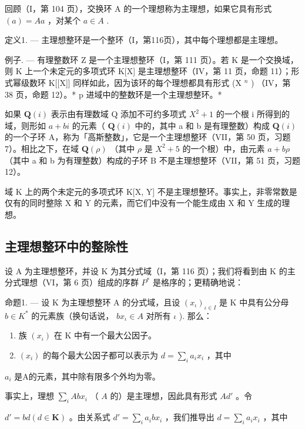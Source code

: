 回顾（I，第 104 页），交换环 A 的一个理想称为主理想，如果它具有形式 \((a) = A a\) ，对某个 \(a \in A\) .

定义1. --- 主理想整环是一个整环（I，第116页），其中每个理想都是主理想。

例子. --- 有理整数环 Z 是一个主理想整环（I，第 111 页）。若 K 是一个交换域，则 K 上一个未定元的多项式环 K{[}X{]} 是主理想整环（IV，第 11 页，命题 11）；形式幂级数环 K{[}{[}X{]}{]} 同样如此，因为该环的每个理想都具有形式 (X \(^{n}\) ) （IV，第 38 页，命题 12）。* p 进域中的整数环是一个主理想整环。*

如果 \(\mathbf{Q}(i)\) 表示由有理数域 Q 添加不可约多项式 \(X^{2}+1\) 的一个根 i 所得到的域，则形如 \(a+bi\) 的元素（ \(\mathbf{Q}(i)\) 中的，其中 a 和 b 是有理整数）构成 \(\mathbf{Q}(i)\) 的一个子环 A，称为「高斯整数」，它是一个主理想整环（VII，第 50 页，习题 7）。相比之下，在域 \(\mathbf{Q}(\rho)\) （其中 \(\rho\) 是 \(X^{2}+5\) 的一个根）中，由元素 \(a+b\rho\) （其中 a 和 b 为有理整数）构成的子环 B 不是主理想整环（VII，第 51 页，习题 12）。

域 K 上的两个未定元的多项式环 K{[}X, Y{]} 不是主理想整环。事实上，非零常数是仅有的同时整除 X 和 Y 的元素，而它们中没有一个能生成由 X 和 Y 生成的理想。

\subsection{主理想整环中的整除性}

设 A 为主理想整环，并设 K 为其分式域（I，第 116 页）；我们将看到由 K 的主分式理想（VI，第 6 页）组成的序群 \(P^{*}\) 是格序的；更精确地说：

命题1. --- 设 K 为主理想整环 A 的分式域，且设 \((x_{\iota})_{\iota \in I}\) 是 K 中具有公分母 \(b \in K^{*}\) 的元素族（换句话说， \(bx_{\iota} \in A\) 对所有 \(\iota\) ). 那么：

\begin{enumerate}
\def\labelenumi{\alph{enumi})}
\item
  族 \((x_{\iota})\) 在 K 中有一个最大公因子。
\item
  \((x_{i})\) 的每个最大公因子都可以表示为 \(d = \sum_{i}a_{i}x_{i}\) ，其中
\end{enumerate}

\(a_{i}\) 是A的元素，其中除有限多个外均为零。

事实上，理想 \(\sum_{i} A b x_{i}\) （ \(A\) 的）是主理想，因此具有形式 \(A d'\) 。令

\(d' = bd (d \in \mathbf{K})\) 。由关系式 \(d' = \sum_{i} a_i b x_i\) ，我们推导出 \(d = \sum_{i} a_i x_i\) ，其中

